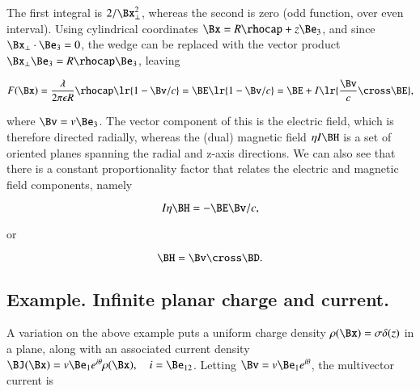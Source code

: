 The first integral is \( 2/\Bx_\perp^2 \), whereas the second is zero (odd function, over even interval).
Using cylindrical coordinates \( \Bx = R \rhocap + z \Be_3 \), and since
\( \Bx_\perp \cdot \Be_3 = 0 \), the wedge can be replaced with the vector product \( \Bx_\perp \Be_3 = R \rhocap \Be_3 \), leaving

\begin{equation}\label{eqn:statics:180}
F(\Bx)
=
\frac{\lambda}{2\pi \epsilon R} \rhocap \lr{ 1 - \Bv/c} = \BE \lr{ 1 - \Bv/c }
= \BE + I \lr{ \frac{\Bv}{c} \cross \BE },
\end{equation}

where \( \Bv = v \Be_3 \).
The vector component of this is the electric field, which is therefore directed radially, whereas the (dual) magnetic field \( \eta I \BH \)
is a set of oriented planes spanning the radial and z-axis directions.
We can also see that there is a constant proportionality factor that relates the electric and magnetic field components, namely

\begin{dmath}\label{eqn:statics:200}
I \eta \BH = -\BE \Bv/c,
\end{dmath}

or

\begin{dmath}\label{eqn:statics:220}
\BH = \Bv \cross \BD.
\end{dmath}


\subsection{Example.  Infinite planar charge and current.}

A variation on the above example puts a uniform charge density \( \rho(\Bx) = \sigma \delta(z) \) in a plane, along with an associated current density \( \BJ(\Bx) = v \Be_1 e^{i\theta} \rho(\Bx), \quad i = \Be_{12} \).  Letting \( \Bv = v \Be_1 e^{i\theta} \), the multivector current is

